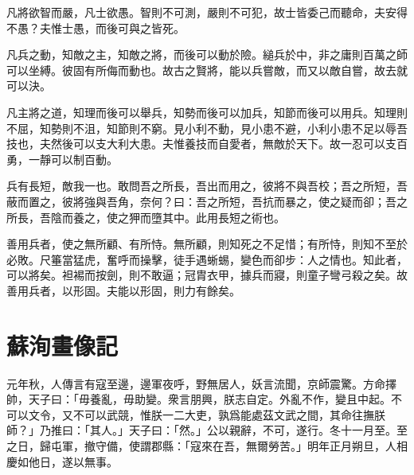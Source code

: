 凡將欲智而嚴，凡士欲愚。智則不可測，嚴則不可犯，故士皆委己而聽命，夫安得不愚？夫惟士愚，而後可與之皆死。

凡兵之動，知敵之主，知敵之將，而後可以動於險。縋兵於中，非之庸則百萬之師可以坐縛。彼固有所侮而動也。故古之賢將，能以兵嘗敵，而又以敵自嘗，故去就可以決。

凡主將之道，知理而後可以舉兵，知勢而後可以加兵，知節而後可以用兵。知理則不屈，知勢則不沮，知節則不窮。見小利不動，見小患不避，小利小患不足以辱吾技也，夫然後可以支大利大患。夫惟養技而自愛者，無敵於天下。故一忍可以支百勇，一靜可以制百動。

兵有長短，敵我一也。敢問吾之所長，吾出而用之，彼將不與吾校；吾之所短，吾蔽而置之，彼將強與吾角，奈何？曰：吾之所短，吾抗而暴之，使之疑而卻；吾之所長，吾陰而養之，使之狎而墮其中。此用長短之術也。

善用兵者，使之無所顧、有所恃。無所顧，則知死之不足惜；有所恃，則知不至於必敗。尺箠當猛虎，奮呼而操擊，徒手遇蜥蜴，變色而卻步：人之情也。知此者，可以將矣。袒裼而按劍，則不敢逼；冠胄衣甲，據兵而寢，則童子彎弓殺之矣。故善用兵者，以形固。夫能以形固，則力有餘矣。

\section[張益州畫像記\quad{\small 蘇洵}]{{\normalsize 蘇洵}\quad{}畫像記}
元年秋，人傳言有寇至{邊}，邊軍夜呼，野無居人，妖言流聞，京師震驚。方命擇帥，天子曰：「毋養亂，毋助變。衆言朋興，朕志自定。外亂不{作}，變且中起。不可以文令，又不可以武競，惟朕一二大吏，孰爲能處茲文武之間，其命往撫朕師？」乃推曰：「其人。」天子曰：「然。」公以親辭，不可，遂行。冬十一月至。至之日，歸屯軍，撤守備，使謂郡縣：「寇來在吾，無爾勞苦。」明年正月朔旦，人相慶如他日，遂以無事。%

